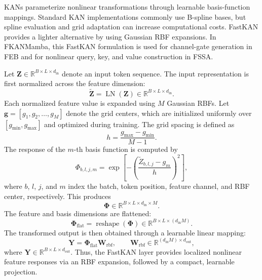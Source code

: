 \documentclass{revision_assets/ieeeaccess_revision}
\begin{document}
KANs parameterize nonlinear transformations through learnable basis-function mappings. Standard KAN implementations commonly use B-spline bases, but spline evaluation and grid adaptation can increase computational costs. FastKAN \cite{ref29} provides a lighter alternative by using Gaussian RBF expansions. In FKANMamba, this FastKAN formulation is used for channel-gate generation in FEB and for nonlinear query, key, and value construction in FSSA.

Let $\mathbf{Z}\in\mathbb{R}^{B\times L\times d_{\mathrm{in}}}$ denote an input token sequence. The input representation is first normalized across the feature dimension:
\begin{equation}
\widetilde{\mathbf{Z}}
=
\operatorname{LN}(\mathbf{Z})
\in
\mathbb{R}^{B\times L\times d_{\mathrm{in}}}.
\label{eq:fastkan_norm}
\end{equation}
Each normalized feature value is expanded using $M$ Gaussian RBFs. Let
$\mathbf{g}=[g_1,g_2,\ldots,g_M]$ denote the grid centers, which are initialized uniformly over $[g_{\min},g_{\max}]$ and optimized during training. The grid spacing is defined as
\begin{equation}
h =
\frac{g_{\max}-g_{\min}}{M-1}.
\end{equation}
The response of the $m$-th basis function is computed by
\begin{equation}
\Phi_{b,l,j,m}
=
\exp
\left[
-
\left(
\frac{\widetilde{Z}_{b,l,j}-g_m}{h}
\right)^2
\right],
\label{eq:fastkan_rbf}
\end{equation}
where $b$, $l$, $j$, and $m$ index the batch, token position, feature channel, and RBF center, respectively. This produces
\begin{equation}
\boldsymbol{\Phi}
\in
\mathbb{R}^{B\times L\times d_{\mathrm{in}}\times M}.
\end{equation}
The feature and basis dimensions are flattened:
\begin{equation}
\boldsymbol{\Phi}_{\mathrm{flat}}
=
\operatorname{reshape}(\boldsymbol{\Phi})
\in
\mathbb{R}^{B\times L\times(d_{\mathrm{in}}M)}.
\end{equation}
The transformed output is then obtained through a learnable linear mapping:
\begin{equation}
\mathbf{Y}
=
\boldsymbol{\Phi}_{\mathrm{flat}}\mathbf{W}_{\mathrm{rbf}},
\qquad
\mathbf{W}_{\mathrm{rbf}}
\in
\mathbb{R}^{(d_{\mathrm{in}}M)\times d_{\mathrm{out}}},
\label{eq:fastkan_output}
\end{equation}
where $\mathbf{Y}\in\mathbb{R}^{B\times L\times d_{\mathrm{out}}}$. Thus, the FastKAN layer provides localized nonlinear feature responses via an RBF expansion, followed by a compact, learnable projection.
\end{document}
